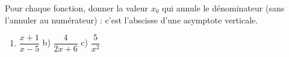 \documentclass[11pt,a4paper]{article}
\begin{document}
\begin{exercice}
Pour chaque fonction, donner la valeur $x_0$ qui annule le dénominateur (sans l'annuler au
numérateur) : c'est l'abscisse d'une asymptote verticale.
\begin{enumerate}[label=\alph*),leftmargin=2em,itemsep=3pt]
  \item $\dfrac{x+1}{x-5}$ \qquad b) $\dfrac{4}{2x+6}$ \qquad c) $\dfrac{5}{x^2}$
\end{enumerate}
\end{exercice}
\end{document}
